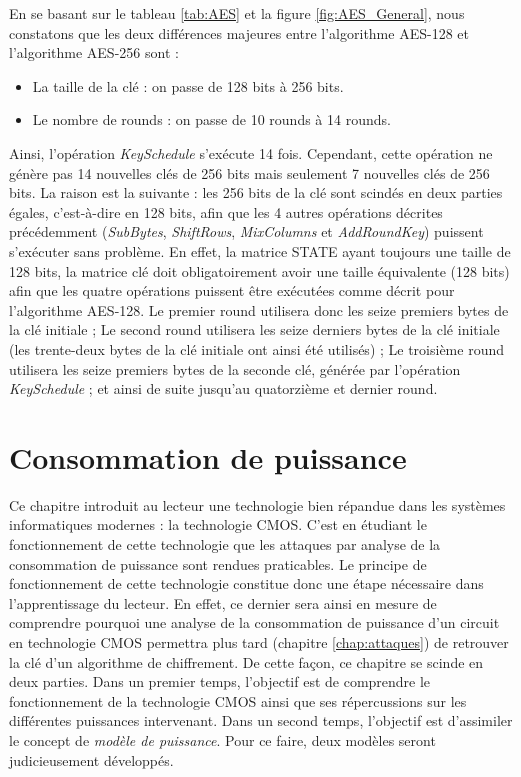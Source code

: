 \documentclass[oneside]{book}
\begin{document}
\vspace{0.1cm}En se basant sur le tableau \ref{tab:AES} et la figure \ref{fig:AES_General}, nous constatons que les deux différences majeures entre l'algorithme AES-128 et l'algorithme AES-256 sont :
\begin{itemize}
\item La taille de la clé : on passe de 128 bits à 256 bits.
\item Le nombre de rounds : on passe de 10 rounds à 14 rounds. \\
\end{itemize}
Ainsi, l'opération \textit{KeySchedule} s'exécute 14 fois. Cependant, cette opération ne génère pas 14 nouvelles clés de 256 bits mais seulement 7 nouvelles clés de 256 bits. La raison est la suivante : les 256 bits de la clé sont scindés en deux parties égales, c'est-à-dire en 128 bits, afin que les 4 autres opérations décrites précédemment (\textit{SubBytes}, \textit{ShiftRows}, \textit{MixColumns} et \textit{AddRoundKey}) puissent s'exécuter sans problème. En effet, la matrice STATE ayant toujours une taille de 128 bits, la matrice clé doit obligatoirement avoir une taille équivalente (128 bits) afin que les quatre opérations puissent être exécutées comme décrit pour l'algorithme AES-128. Le premier round utilisera donc les seize premiers bytes de la clé initiale ; Le second round utilisera les seize derniers bytes de la clé initiale (les trente-deux bytes de la clé initiale ont ainsi été utilisés) ; Le troisième round utilisera les seize premiers bytes de la seconde clé, générée par l'opération \textit{KeySchedule} ; et ainsi de suite jusqu'au quatorzième et dernier round.



\newpage


\chapter{Consommation de puissance}
\label{chap:puissance}

Ce chapitre introduit au lecteur une technologie bien répandue dans les systèmes informatiques modernes : la technologie CMOS. C'est en étudiant le fonctionnement de cette technologie que les attaques par analyse de la consommation de puissance sont rendues praticables. Le principe de fonctionnement de cette technologie constitue donc une étape nécessaire dans l'apprentissage du lecteur. En effet, ce dernier sera ainsi en mesure de comprendre pourquoi une analyse de la consommation de puissance d'un circuit en technologie CMOS permettra plus tard (chapitre \ref{chap:attaques}) de retrouver la clé d'un algorithme de chiffrement. De cette façon, ce chapitre se scinde en deux parties. Dans un premier temps, l'objectif est de comprendre le fonctionnement de la technologie CMOS ainsi que ses répercussions sur les différentes puissances intervenant. Dans un second temps, l'objectif est d'assimiler le concept de \textit{modèle de puissance}. Pour ce faire, deux modèles seront judicieusement développés.
\end{document}
